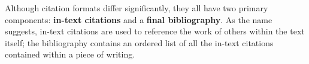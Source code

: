 Although citation formats differ significantly, they all have two primary components: 
\textbf{in-text citations} and a \textbf{final bibliography}. As the name suggests, in-text 
citations are used to reference the work of others within the text itself; the 
bibliography contains an ordered list of all the in-text citations contained within a 
piece of writing.


